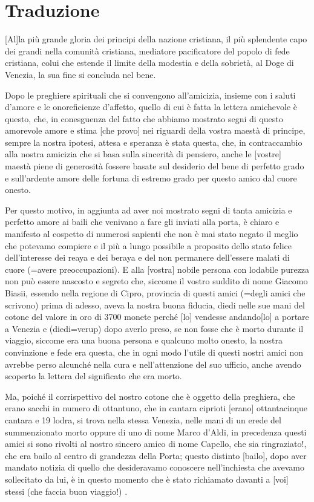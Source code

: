 \section{Traduzione}

[Al]la più grande gloria dei  principi della nazione cristiana, il più
splendente  capo  dei   grandi  nella  comunità  cristiana,  mediatore
pacificatore del popolo di fede cristiana, colui che estende il limite
della modestia  e della sobrietà, al  Doge di Venezia, la  sua fine si
concluda nel bene.

Dopo le  preghiere spirituali che si  convengono all'amicizia, insieme
con i  saluti d'amore  e le onoreficienze  d'affetto, quello di  cui è
fatta la  lettera amichevole è  questo, che, in conesguenza  del fatto
che  abbiamo mostrato  segni di  questo amorevole  amore e  stima [che
  provo]  nei riguardi  della  vostra maestà  di  principe, sempre  la
nostra   ipotesi,  attesa  e   speranza  è   stata  questa,   che,  in
contraccambio  alla nostra  amicizia che  si basa  sulla  sincerità di
pensiero, anche le [vostre]  maestà piene di generosità fossere basate
sul desiderio  del bene di  perfetto grado e sull'ardente  amore delle
fortuna di estremo grado per questo amico dal cuore onesto.

Per questo  motivo, in  aggiunta ad aver  noi mostrato segni  di tanta
amicizia e  perfetto amore  ai baili che  venivano a fare  gli inviati
alla porta, è chiaro e  manifesto al cospetto di numerosi sapienti che
non è  mai stato  negato il meglio  che potevamo  compiere e il  più a
lungo  possibile a  proposito  dello stato  felice dell'interesse  dei
reaya e  dei beraya  e del non  permanere dell'essere malati  di cuore
(=avere preoccupazioni).  E alla  [vostra] nobile persona con lodabile
purezza  non può  essere nascosto  e  segreto che,  siccome il  vostro
suddito  di  nome Giacomo  Biasii,  essendo  nella  regione di  Cipro,
provincia di questi amici (=degli amici che scrivono) prima di adesso,
aveva la  nostra buona  fiducia, diedi nelle  sue mani del  cotone del
valore  in oro  di  3700  monete perché  [lo]  vendesse andando[lo]  a
portare a Venezia e (diedi=verup)  dopo averlo preso, se non fosse che
è morto durante  il viaggio, siccome era una  buona persona e qualcuno
molto onesto,  la nostra  convinzione e fede  era questa, che  in ogni
modo l'utile di  questi nostri amici non avrebbe  perso alcunché nella
cura  e nell'attenzione  del  suo ufficio,  anche  avendo scoperto  la
lettera del significato che era morto.

Ma,  poiché il  corrispettivo del  nostro cotone  che è  oggetto della
preghiera, che  erano sacchi  in numero di  ottantuno, che  in cantara
ciprioti  [erano] ottantacinque  cantara e  19 lodra,  si  trova nella
stessa Venezia, nelle mani di  un erede del summenzionato morto oppure
di  uno di  nome  Marco d'Aldi,  in  precedenza questi  amici si  sono
rivolti al nostro sincero amico di nome Capello, che sia ringraziato!,
che  era bailo  al centro  di grandezza  della Porta;  questo distinto
[bailo],  dopo  aver  mandato   notizia  di  quello  che  desideravamo
conoscere nell'inchiesta  che avevamo sollecitato da lui,  è in questo
momento che è stato richiamato davanti a [voi] stessi (che faccia buon
viaggio!) . 

